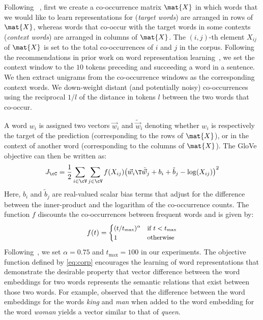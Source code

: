 \documentclass[letterpaper]{article}
\newcommand{\citet}[1]{\citeauthor{#1} \shortcite{#1}}
\newcommand{\citep}{\cite}
\begin{document}
Following~\citet{Pennington:EMNLP:2014}, first we create a co-occurrence matrix $\mat{X}$ in which
words that we would like to learn representations for (\emph{target words}) are arranged in rows of $\mat{X}$, whereas words
that co-occur with the target words in some contexts (\emph{context words}) are arranged in columns of $\mat{X}$.
The $(i,j)$-th element $X_{ij}$ of $\mat{X}$ is set to the total co-occurrences of $i$ and $j$ in the corpus.
Following the recommendations in prior work on word representation learning~\citep{Levy:TACL:2015},
we set the context window to the $10$ tokens preceding and succeeding a word in a sentence.
We then extract unigrams from the co-occurrence windows
 as the corresponding context words. We down-weight distant (and potentially noisy) co-occurrences
 using the reciprocal $1/l$ of the distance in tokens $l$ between the two words that co-occur.

A word $w_i$ is assigned two vectors $\vec{w}_i$ and $\tilde{\vec{w}}_i$ denoting whether $w_i$ is respectively
the target of the prediction  (corresponding to the rows of $\mat{X}$),
or in the context of another word (corresponding to the columns of $\mat{X}$).
The GloVe objective can then be written as:
\begin{equation}
\small
\label{eq:corp}
J_{\cC} = \frac{1}{2} \sum_{i \in \cV} \sum_{j \in \cV} f(X_{ij}) {\left(\vec{w}_i\T\tilde{\vec{w}}_j +b_i + \tilde{b}_j  - \log(X_{ij}) \right)}^2
\end{equation}
Here, $b_i$ and $\tilde{b}_j$ are real-valued scalar bias terms that adjust for
the difference between the inner-product and the logarithm of
the co-occurrence counts.
The function $f$ discounts the co-occurrences between frequent words and is given by:
\begin{equation}
\small
f(t) = \begin{cases} (t/t_{\max})^\alpha & \text{if $t < t_{\max}$} \\
				1 & \text{otherwise}
	\end{cases}
\end{equation}
Following~\cite{Pennington:EMNLP:2014}, we set $\alpha = 0.75$ and $t_{\max} = 100$ in our experiments.
The objective function defined by \eqref{eq:corp} encourages the learning of word representations that demonstrate the
desirable property that vector difference between the word embeddings for two words represents the semantic relations
that exist between those two words. For example, \citet{Mikolov:NAACL:2013} observed that 
the difference between the word embeddings for the words \emph{king} and \emph{man} when added to the word embedding
for the word \emph{woman} yields a vector similar to that of \emph{queen}.
\end{document}
